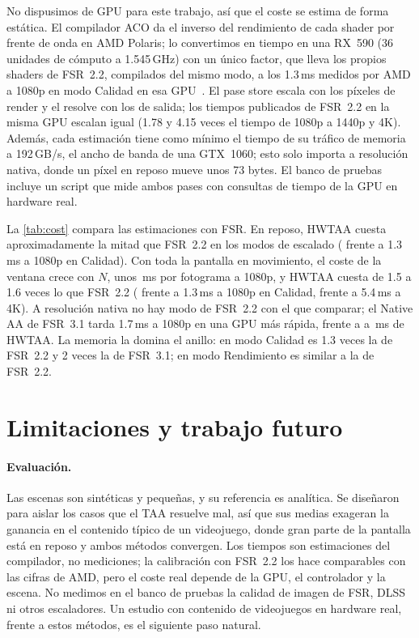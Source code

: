 \documentclass[11pt,a4paper]{article}
\begin{document}
No dispusimos de GPU para este trabajo, así que el coste se estima de forma estática. El compilador ACO da el inverso del rendimiento de cada shader por frente de onda en AMD Polaris; lo convertimos en tiempo en una RX~590 (36 unidades de cómputo a 1.545\,GHz) con un único factor, que lleva los propios shaders de FSR~2.2, compilados del mismo modo, a los 1.3\,ms medidos por AMD a 1080p en modo Calidad en esa GPU~\cite{amd2023fsr2}. El pase store escala con los píxeles de render y el resolve con los de salida; los tiempos publicados de FSR~2.2 en la misma GPU escalan igual (1.78 y 4.15 veces el tiempo de 1080p a 1440p y 4K). Además, cada estimación tiene como mínimo el tiempo de su tráfico de memoria a 192\,GB/s, el ancho de banda de una GTX~1060; esto solo importa a resolución nativa, donde un píxel en reposo mueve unos 73 bytes. El banco de pruebas incluye un script que mide ambos pases con consultas de tiempo de la GPU en hardware real.

La \cref{tab:cost} compara las estimaciones con FSR. En reposo, HWTAA cuesta aproximadamente la mitad que FSR~2.2 en los modos de escalado (\nMsStillQHd{} frente a 1.3\,ms a 1080p en Calidad). Con toda la pantalla en movimiento, el coste de la ventana crece con $N$, unos \nMsPerFrameHd{}\,ms por fotograma a 1080p, y HWTAA cuesta de 1.5 a 1.6 veces lo que FSR~2.2 (\nMsMovingQHd{} frente a 1.3\,ms a 1080p en Calidad, \nMsMovingQUhd{} frente a 5.4\,ms a 4K). A resolución nativa no hay modo de FSR~2.2 con el que comparar; el Native AA de FSR~3.1 tarda 1.7\,ms a 1080p en una GPU más rápida, frente a \nMsStillNatHd{} a \nMsMovingNatHd{}\,ms de HWTAA. La memoria la domina el anillo: en modo Calidad es 1.3 veces la de FSR~2.2 y 2 veces la de FSR~3.1; en modo Rendimiento es similar a la de FSR~2.2.

\section{Limitaciones y trabajo futuro}
\label{sec:limitations}

\paragraph{Evaluación.} Las escenas son sintéticas y pequeñas, y su referencia es analítica. Se diseñaron para aislar los casos que el TAA resuelve mal, así que sus medias exageran la ganancia en el contenido típico de un videojuego, donde gran parte de la pantalla está en reposo y ambos métodos convergen. Los tiempos son estimaciones del compilador, no mediciones; la calibración con FSR~2.2 los hace comparables con las cifras de AMD, pero el coste real depende de la GPU, el controlador y la escena. No medimos en el banco de pruebas la calidad de imagen de FSR, DLSS ni otros escaladores. Un estudio con contenido de videojuegos en hardware real, frente a estos métodos, es el siguiente paso natural.
\end{document}
